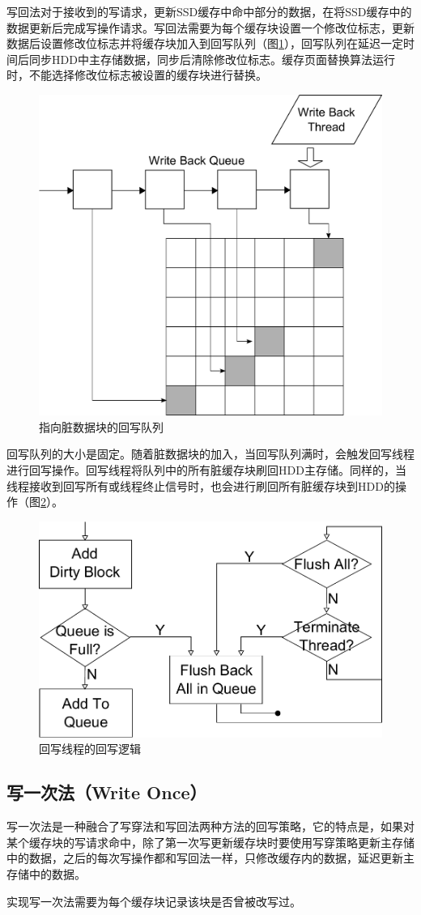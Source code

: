 写回法对于接收到的写请求，更新SSD缓存中命中部分的数据，在将SSD缓存中的数据更新后完成写操作请求。写回法需要为每个缓存块设置一个修改位标志，更新数据后设置修改位标志并将缓存块加入到回写队列（图\ref{fig:write-back-queue}），回写队列在延迟一定时间后同步HDD中主存储数据，同步后清除修改位标志。缓存页面替换算法运行时，不能选择修改位标志被设置的缓存块进行替换。

\begin{figure}[H]
\centering
\includegraphics[width=0.4\linewidth]{./graph/write-back-queue}
\caption{指向脏数据块的回写队列}
\label{fig:write-back-queue}
\end{figure}

回写队列的大小是固定。随着脏数据块的加入，当回写队列满时，会触发回写线程进行回写操作。回写线程将队列中的所有脏缓存块刷回HDD主存储。同样的，当线程接收到回写所有或线程终止信号时，也会进行刷回所有脏缓存块到HDD的操作（图\ref{fig:write-back-thread}）。

\begin{figure}[H]
\centering
\includegraphics[width=0.6\linewidth]{./graph/write-back-thread}
\caption{回写线程的回写逻辑}
\label{fig:write-back-thread}
\end{figure}

\subsection{写一次法（Write Once）}
写一次法是一种融合了写穿法和写回法两种方法的回写策略，它的特点是，如果对某个缓存块的写请求命中，除了第一次写更新缓存块时要使用写穿策略更新主存储中的数据，之后的每次写操作都和写回法一样，只修改缓存内的数据，延迟更新主存储中的数据。

实现写一次法需要为每个缓存块记录该块是否曾被改写过。

